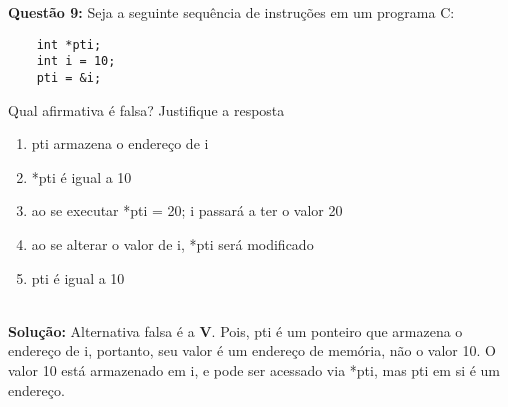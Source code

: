 \documentclass[12pt]{article}
\begin{document}
\textbf{Questão 9:} Seja a seguinte sequência de instruções em um programa C:
\begin{verbatim}
    int *pti;
    int i = 10;
    pti = &i;
\end{verbatim}
    Qual afirmativa é falsa? Justifique a resposta
\begin{enumerate}[label=\Roman* -]
    \item pti armazena o endereço de i
    \item *pti é igual a 10
    \item ao se executar *pti = 20; i passará a ter o valor 20
    \item ao se alterar o valor de i, *pti será modificado
    \item pti é igual a 10
\end{enumerate}
\\

\noindent\textbf{Solução:}
Alternativa falsa é a \textbf{V}. Pois, pti é um ponteiro que armazena o endereço de i, portanto, seu valor é um endereço de memória, não o valor 10. O valor 10 está armazenado em i, e pode ser acessado via *pti, mas pti em si é um endereço.
\end{document}
